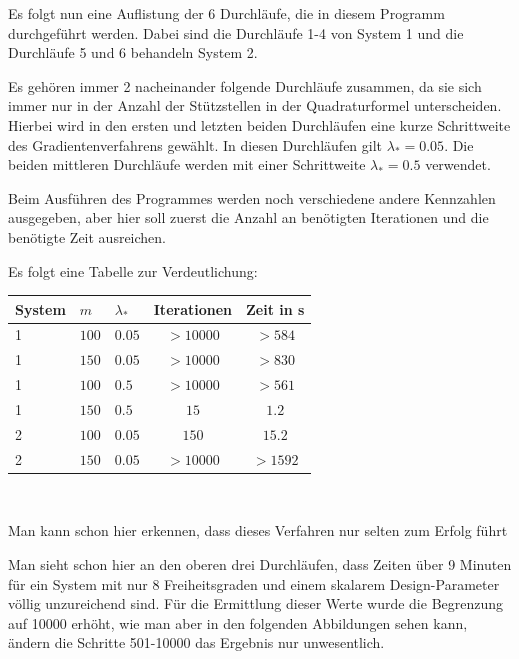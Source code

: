 \documentclass[a4paper,12pt]{report}
\newcommand{\1}{\mathds{1}}
\theoremstyle{plain} %
\theoremstyle{definition} %
\theoremstyle{remark}
\begin{document}
            Es folgt nun eine Auflistung der 6 Durchläufe, die in diesem Programm durchgeführt werden.
            Dabei sind die Durchläufe 1-4 von System 1 und die Durchläufe 5 und 6 behandeln System 2.

            Es gehören immer 2 nacheinander folgende Durchläufe zusammen, da sie sich immer nur in der Anzahl der Stützstellen in der Quadraturformel unterscheiden.
            Hierbei wird in den ersten und letzten beiden Durchläufen eine kurze Schrittweite des Gradientenverfahrens gewählt. In diesen Durchläufen gilt $\lambda_* = 0.05$.
            Die beiden mittleren Durchläufe werden mit einer Schrittweite $\lambda_* = 0.5$ verwendet.

            Beim Ausführen des Programmes werden noch verschiedene andere Kennzahlen ausgegeben, aber hier soll zuerst die Anzahl an benötigten Iterationen und die benötigte Zeit ausreichen.

            Es folgt eine Tabelle zur Verdeutlichung:\\

            \begin{table}[ht]
                  \centering
                  \begin{tabular}{lllcc}
                       System & $m$ & $\lambda_*$ & Iterationen & Zeit in s\\
                       \hline
                       1 & $100$ & $0.05$ & $>10000$ & $>584$ \\ 
                       1 & $150$ & $0.05$ & $>10000$ & $>830$ \\
                       \hline
                       1 & $100$ & $0.5$ & $>10000$ & $>561$ \\
                       1 & $150$ & $0.5$ & $15$ & $1.2$ \\
                       \hline
                       2 & $100$ & $0.05$ & $150$ & $15.2$ \\
                       2 & $150$ & $0.05$ & $>10000$ & $>1592$ \\
                       \hline
                  \end{tabular}\\
            \end{table}

            Man kann schon hier erkennen, dass dieses Verfahren nur selten zum Erfolg führt

            Man sieht schon hier an den oberen drei Durchläufen, dass Zeiten über 9 Minuten für ein System mit nur 8 Freiheitsgraden und einem skalarem Design-Parameter völlig unzureichend sind.
            Für die Ermittlung dieser Werte wurde die Begrenzung auf 10000 erhöht, wie man aber in den folgenden Abbildungen sehen kann, ändern die Schritte 501-10000 das Ergebnis nur unwesentlich. 
\end{document}
